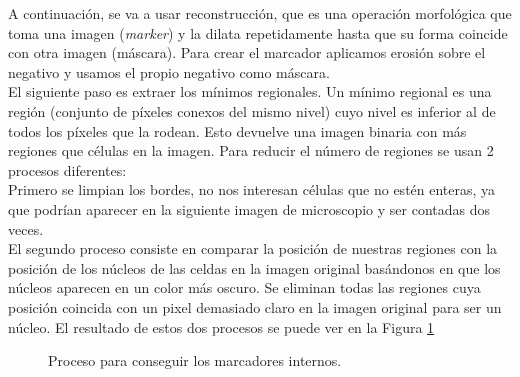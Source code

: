 A continuación, se va a usar reconstrucción, que es una operación morfológica que toma una imagen (\emph{marker}) y la dilata repetidamente hasta que su forma coincide con otra imagen (máscara). Para crear el marcador aplicamos erosión sobre el negativo y usamos el propio negativo como máscara.\\ 

El siguiente paso es extraer los mínimos regionales. Un mínimo regional es una región (conjunto de píxeles conexos del mismo nivel) cuyo nivel es inferior al de todos los píxeles que la rodean. Esto devuelve una imagen binaria con más regiones que células en la imagen. Para reducir el número de regiones se usan 2 procesos diferentes:\\

Primero se limpian los bordes, no nos interesan células que no estén enteras, ya que podrían aparecer en la siguiente imagen de microscopio y ser contadas dos veces.\\

El segundo proceso consiste en comparar la posición de nuestras regiones con la posición de los núcleos de las celdas en la imagen original basándonos en que los núcleos aparecen en un color más oscuro. Se eliminan todas las regiones cuya posición coincida con un pixel demasiado claro en la imagen original para ser un núcleo. El resultado de estos dos procesos se puede ver en la Figura \ref{procesos}\\

\begin{figure}[!tbp]
  \centering
  \hfill
  \caption{Proceso para conseguir los marcadores internos.}
  \label{procesos}
\end{figure}

